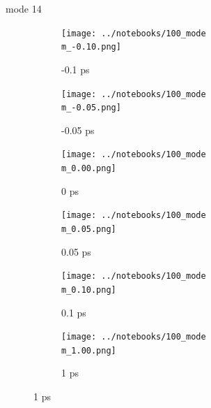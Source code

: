 \documentclass{beamer}
\begin{document}
\renewcommand\m{14}
\begin{frame}{mode \m}
	\begin{figure}
		\centering
		\begin{subfigure}[b]{\w\textwidth}
			\centering
			\texttt{[image: ../notebooks/100\_mode\\m\_-0.10.png]}
			\caption{-0.1 ps}
		\end{subfigure}
		\begin{subfigure}[b]{\w\textwidth}
			\centering
			\texttt{[image: ../notebooks/100\_mode\\m\_-0.05.png]}
			\caption{-0.05 ps}
		\end{subfigure}
		\begin{subfigure}[b]{\w\textwidth}
			\centering
			\texttt{[image: ../notebooks/100\_mode\\m\_0.00.png]}
			\caption{0 ps}
		\end{subfigure}
		\begin{subfigure}[b]{\w\textwidth}
			\centering
			\texttt{[image: ../notebooks/100\_mode\\m\_0.05.png]}
			\caption{0.05 ps}
		\end{subfigure}
		\begin{subfigure}[b]{\w\textwidth}
			\centering
			\texttt{[image: ../notebooks/100\_mode\\m\_0.10.png]}
			\caption{0.1 ps}
		\end{subfigure}
		\begin{subfigure}[b]{\w\textwidth}
			\centering
			\texttt{[image: ../notebooks/100\_mode\\m\_1.00.png]}
			\caption{1 ps}
		\end{subfigure}
	\end{figure}
\end{frame}
\end{document}
